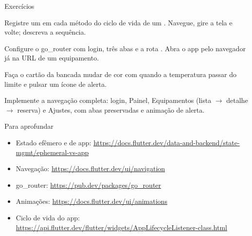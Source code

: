 \documentclass[aspectratio=169,10pt]{beamer}
\begin{document}
\begin{frame}{Exercícios}
  \begin{exercicio}
    Registre um  em cada método do ciclo de vida de um . Navegue, gire a tela e volte; descreva a sequência.
  \end{exercicio}
  \begin{exercicio}
    Configure o go\_router com login, três abas e a rota . Abra o app pelo navegador já na URL de um equipamento.
  \end{exercicio}
  \begin{exercicio}
    Faça o cartão da bancada mudar de cor com  quando a temperatura passar do limite e pulsar um ícone de alerta.
  \end{exercicio}
  \begin{projeto}
    Implemente a navegação completa: login, Painel, Equipamentos (lista $\rightarrow$ detalhe $\rightarrow$ reserva) e Ajustes, com abas preservadas e animação de alerta.
  \end{projeto}
\end{frame}

\begin{frame}{Para aprofundar}
  \small
  \begin{itemize}
    \item Estado efêmero e de app: \url{https://docs.flutter.dev/data-and-backend/state-mgmt/ephemeral-vs-app}
    \item Navegação: \url{https://docs.flutter.dev/ui/navigation}
    \item go\_router: \url{https://pub.dev/packages/go_router}
    \item Animações: \url{https://docs.flutter.dev/ui/animations}
    \item Ciclo de vida do app: \url{https://api.flutter.dev/flutter/widgets/AppLifecycleListener-class.html}
  \end{itemize}
\end{frame}
\end{document}
